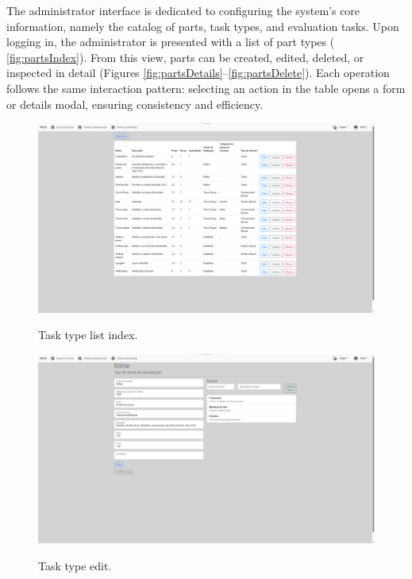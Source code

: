 The administrator interface is dedicated to configuring the system's core information, namely the catalog of parts, task types, and evaluation tasks. Upon logging in, the administrator is presented with a list of part types ( \ref{fig:partsIndex}). From this view, parts can be created, edited, deleted, or inspected in detail (Figures \ref{fig:partsDetails}–\ref{fig:partsDelete}). Each operation follows the same interaction pattern: selecting an action in the table opens a form or details modal, ensuring consistency and efficiency.



\begin{figure}[h]
  \caption{Task type list index.}
  \centering
  \includegraphics[width=\textwidth]{figs/Implementation/dealershipAdmin/taskIndex}
  \label{fig:taskIndex}
\end{figure}

\begin{figure}[h]
  \caption{Task type edit.}
  \centering
  \includegraphics[width=\textwidth]{figs/Implementation/dealershipAdmin/taskEdit}
  \label{fig:taskEdit}
\end{figure}


